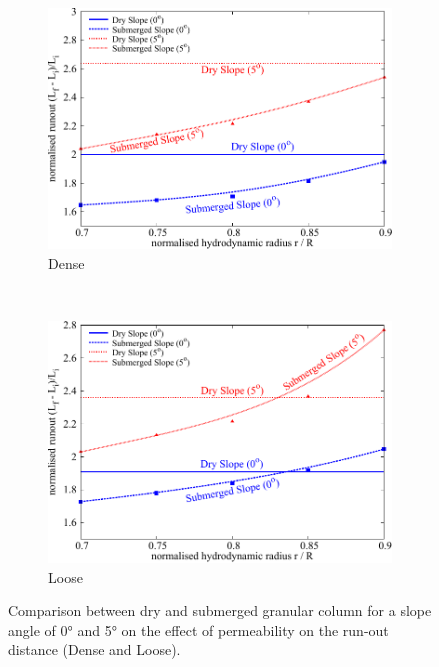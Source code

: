 \documentclass[12pt,twoside]{tuhhproc-en}
\begin{document}
\begin{figure}[!ht]
	\centering
\begin{subfigure}[b]{0.85\textwidth}
	\centering
    \includegraphics[width=\textwidth]{figs/Perm_Runout_a08_dense}
    \caption{Dense}
    \label{fig:Perm_Runout_a08_dense}
\end{subfigure}\\
\begin{subfigure}[b]{0.85\textwidth}
	\centering
    \includegraphics[width=\textwidth]{figs/Perm_Runout_a08_loose}
    \caption{Loose}
    \label{fig:Perm_Runout_a08_loose}
\end{subfigure}
\caption{Comparison between dry and submerged granular column for a slope angle 
of 0\si{\degree} and 5\si{\degree} on the effect of permeability on the run-out 
distance (Dense and Loose).}
\label{fig:Perm_Runout_loose_dense}
\end{figure}
\end{document}
